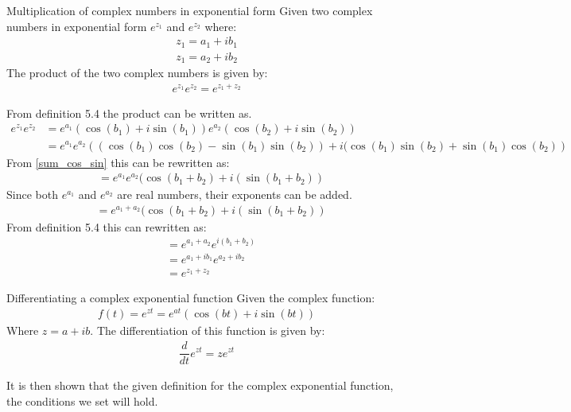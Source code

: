 \begin{theorem}{Multiplication of complex numbers in exponential form}{}
Given two complex numbers in exponential form $e^{z_1}$ and $e^{z_2}$ where:
\begin{align*}
z_1=a_1+ib_1
\\
z_1=a_2+ib_2
\end{align*}
The product of the two complex numbers is given by:
\begin{align*}
e^{z_1}e^{z_2}=e^{z_1+z_2}
\end{align*}
\end{theorem}
\begin{prof}{}{}
From definition 5.4 %
the product can be written as.
\begin{align*}
e^{z_1}e^{z_2}&=e^{a_1}(\cos(b_1)+i\sin(b_1))e^{a_2}(\cos(b_2)+i\sin(b_2))
\\
&=e^{a_1}e^{a_2}\left( (\cos(b_1)\cos(b_2)-\sin(b_1) \sin(b_2))+i(\cos(b_1)\sin(b_2)+\sin(b_1)\cos(b_2)\right)
\end{align*}
From \eqref{sum_cos_sin} this can be rewritten as:
\begin{align*}
&=e^{a_1}e^{a_2}(\cos(b_1+b_2)+i(\sin(b_1+b_2))
\end{align*}
Since both $e^{a_1}$ and $e^{a_2}$ are real numbers, their exponents can be added.
\begin{align*}
&=e^{a_1+a_2}(\cos(b_1+b_2)+i(\sin(b_1+b_2))
\end{align*}
From definition 5.4 %
this can rewritten as:
\begin{align*}
&=e^{a_1+a_2}e^{i(b_1+b_2)}
\\
&=e^{a_1+ib_1}e^{a_2+ib_2}
\\
&=e^{z_1+z_2}
\end{align*} 
\end{prof}
\begin{theorem}{Differentiating a complex exponential function}{}
Given the complex function:
\begin{align*}
f(t)=e^{zt}=e^{at}(\cos(bt)+i\sin(bt))
\end{align*}
Where $z=a+ib$. The differentiation of this function is given by:
\begin{align*}
\dfrac{d}{dt}e^{zt}=ze^{zt}
\end{align*}
\end{theorem}

It is then shown that the given definition for the complex exponential function, the conditions we set will hold.